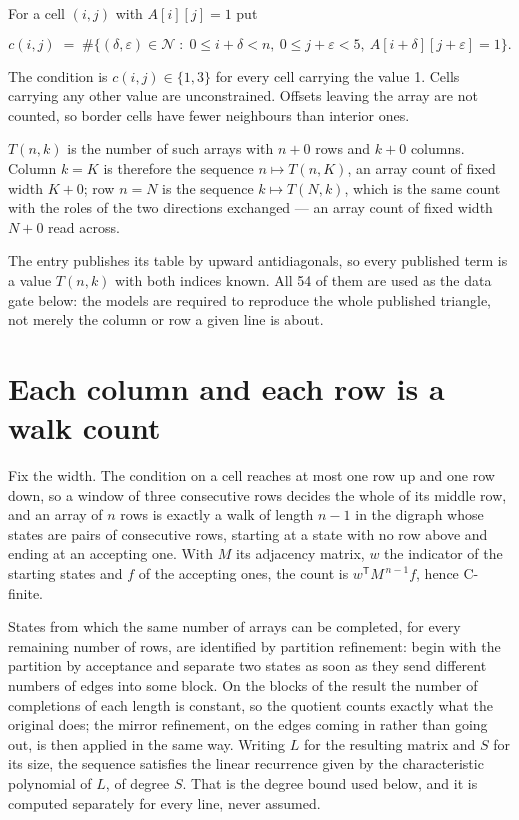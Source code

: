 \documentclass[11pt]{article}
\theoremstyle{definition}
\begin{document}
For a cell $(i,j)$ with $A[i][j] = 1$ put

\[c(i,j) \;=\; \#\bigl\{(\delta,\varepsilon)\in\mathcal{N} \;:\; 0\le i+\delta<n,\ 0\le j+\varepsilon<5,\ A[i+\delta][j+\varepsilon] = 1\bigr\}.\]

The condition is $c(i,j) \in \{1, 3\}$ for every cell carrying the value 1. Cells carrying any other value are unconstrained. Offsets leaving the array are not counted, so border cells have fewer neighbours than interior ones.

$T(n,k)$ is the number of such arrays with $n + 0$ rows and $k + 0$ columns. Column $k = K$ is therefore the sequence $n \mapsto T(n,K)$, an array count of fixed width $K + 0$; row $n = N$ is the sequence $k \mapsto T(N,k)$, which is the same count with the roles of the two directions exchanged --- an array count of fixed width $N + 0$ read across.

The entry publishes its table by upward antidiagonals, so every published term is a value $T(n,k)$ with both indices known. All 54 of them are used as the data gate below: the models are required to reproduce the whole published triangle, not merely the column or row a given line is about.

\section{Each column and each row is a walk count}

Fix the width. The condition on a cell reaches at most one row up and one row down, so a window of three consecutive rows decides the whole of its middle row, and an array of $n$ rows is exactly a walk of length $n-1$ in the digraph whose states are pairs of consecutive rows, starting at a state with no row above and ending at an accepting one. With $M$ its adjacency matrix, $w$ the indicator of the starting states and $f$ of the accepting ones, the count is $w^{\mathsf T}M^{\,n-1}f$, hence C-finite.

States from which the same number of arrays can be completed, for every remaining number of rows, are identified by partition refinement: begin with the partition by acceptance and separate two states as soon as they send different numbers of edges into some block. On the blocks of the result the number of completions of each length is constant, so the quotient counts exactly what the original does; the mirror refinement, on the edges coming in rather than going out, is then applied in the same way. Writing $L$ for the resulting matrix and $S$ for its size, the sequence satisfies the linear recurrence given by the characteristic polynomial of $L$, of degree $S$. That is the degree bound used below, and it is computed separately for every line, never assumed.
\end{document}
